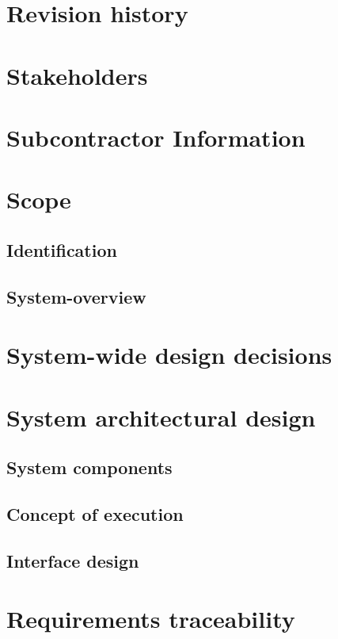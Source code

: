 \documentclass[a4paper, oneside, 11pt]{article}
\begin{document}

\addtolength{\topmargin}{-2cm}
\tableofcontents

\noindent
\section{Revision history}

\section{Stakeholders}

\section{Subcontractor Information}

\section{Scope}

\subsection{Identification}

\subsection{System-overview}

%
\section{System-wide design decisions}

\section{System architectural design}

\subsection{System components}

\subsection{Concept of execution}

\subsection{Interface design}

\section{Requirements traceability}

\end{document}
